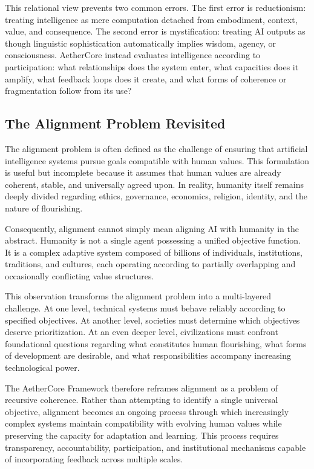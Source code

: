 \documentclass[12pt]{article}
\begin{document}
This relational view prevents two common errors. The first error is reductionism: treating intelligence as mere computation detached from embodiment, context, value, and consequence. The second error is mystification: treating AI outputs as though linguistic sophistication automatically implies wisdom, agency, or consciousness. AetherCore instead evaluates intelligence according to participation: what relationships does the system enter, what capacities does it amplify, what feedback loops does it create, and what forms of coherence or fragmentation follow from its use?

\subsection{The Alignment Problem Revisited}

The alignment problem is often defined as the challenge of ensuring that artificial intelligence systems pursue goals compatible with human values. This formulation is useful but incomplete because it assumes that human values are already coherent, stable, and universally agreed upon. In reality, humanity itself remains deeply divided regarding ethics, governance, economics, religion, identity, and the nature of flourishing.

Consequently, alignment cannot simply mean aligning AI with humanity in the abstract. Humanity is not a single agent possessing a unified objective function. It is a complex adaptive system composed of billions of individuals, institutions, traditions, and cultures, each operating according to partially overlapping and occasionally conflicting value structures.

This observation transforms the alignment problem into a multi-layered challenge. At one level, technical systems must behave reliably according to specified objectives. At another level, societies must determine which objectives deserve prioritization. At an even deeper level, civilizations must confront foundational questions regarding what constitutes human flourishing, what forms of development are desirable, and what responsibilities accompany increasing technological power.

The AetherCore Framework therefore reframes alignment as a problem of recursive coherence. Rather than attempting to identify a single universal objective, alignment becomes an ongoing process through which increasingly complex systems maintain compatibility with evolving human values while preserving the capacity for adaptation and learning. This process requires transparency, accountability, participation, and institutional mechanisms capable of incorporating feedback across multiple scales.
\end{document}
